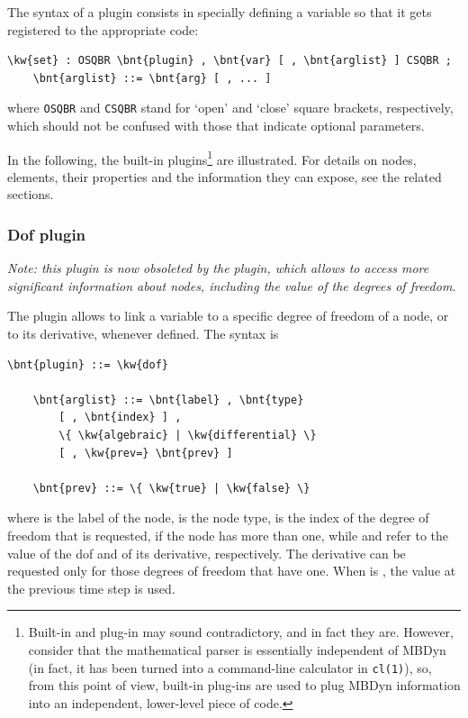 The syntax of a plugin consists in specially defining a variable
so that it gets registered to the appropriate code:
\begin{Verbatim}[commandchars=\\\{\}]
    \kw{set} : OSQBR \bnt{plugin} , \bnt{var} [ , \bnt{arglist} ] CSQBR ;
    \bnt{arglist} ::= \bnt{arg} [ , ... ]
\end{Verbatim}
where \texttt{OSQBR} and \texttt{CSQBR} stand for `open' and `close'
square brackets, respectively, which should not be confused with those
that indicate optional parameters.

In the following, the built-in plugins\footnote{Built-in and plug-in
may sound contradictory, and in fact they are.  However, consider
that the mathematical parser is essentially independent of MBDyn
(in fact, it has been turned into a command-line calculator
in \texttt{cl(1)}), so, from this point of view, built-in plug-ins
are used to plug MBDyn information into an independent, lower-level
piece of code.} are illustrated.
For details on nodes, elements, their properties and the information
they can expose, see the related sections.

\subsubsection{Dof plugin}
\emph{Note: this plugin is now obsoleted by the  plugin,
which allows to access more significant information about nodes,
including the value of the degrees of freedom.}

The  plugin allows to link a variable to a specific degree of freedom
of a node, or to its derivative, whenever defined.
The syntax is
\begin{Verbatim}[commandchars=\\\{\}]
    \bnt{plugin} ::= \kw{dof}

    \bnt{arglist} ::= \bnt{label} , \bnt{type}
        [ , \bnt{index} ] ,
        \{ \kw{algebraic} | \kw{differential} \}
        [ , \kw{prev=} \bnt{prev} ]

    \bnt{prev} ::= \{ \kw{true} | \kw{false} \}
\end{Verbatim}
where
 is the label of the node,
 is the node type,
 is the index of the degree of freedom that is requested,
if the node has more than one, while
 and  refer to the value of the dof
and of its derivative, respectively.
The derivative can be requested only for those degrees of freedom
that have one.
When  is , the value at the previous time step is used.


